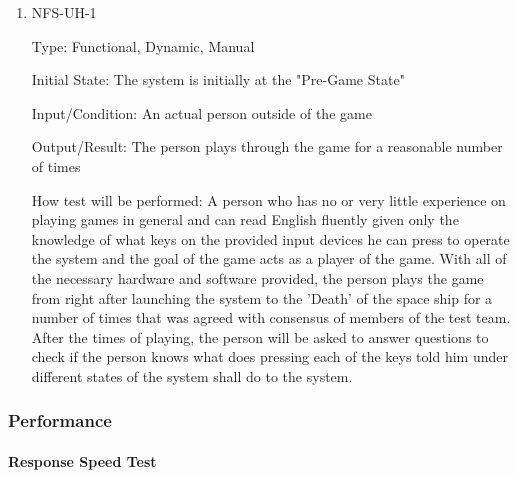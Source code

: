 \documentclass[12pt, titlepage]{article}
\begin{document}
\begin{enumerate}

\item{NFS-UH-1\\}

Type: Functional, Dynamic, Manual
					
Initial State: The system is initially at the "Pre-Game State"
					
Input/Condition: An actual person outside of the game 
					
Output/Result: The person plays through the game for a reasonable number of times
					
How test will be performed: A person who has no or very little experience on playing games in general and can read English fluently given only the knowledge of what keys on the provided input devices he can press to operate the system and the goal of the game acts as a player of the game. With all of the necessary hardware and software provided, the person plays the game from right after launching the system to the 'Death' of the space ship for a number of times that was agreed with consensus of members of the test team. After the times of playing, the person will be asked to answer questions to check if the person knows what does pressing each of the keys told him under different states of the system shall do to the system. 

\end{enumerate}

\subsubsection{Performance}

\paragraph{Response Speed Test}
\end{document}
